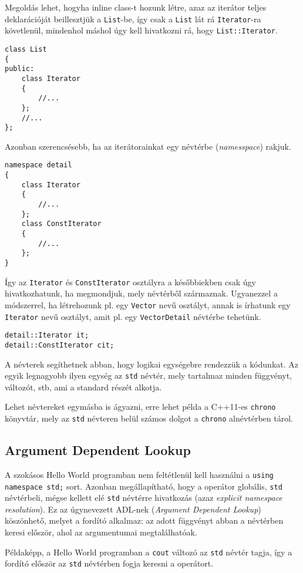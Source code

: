 \documentclass[a4paper,11.5pt,table]{article}
\begin{document}
	Megoldás lehet, hogyha inline class-t hozunk létre, azaz az iterátor teljes deklarációját beillesztjük a \texttt{List}-be, így csak a \texttt{List} lát rá \texttt{Iterator}-ra követlenül, mindenhol máshol úgy kell hivatkozni rá, hogy \texttt{List::Iterator}.
	\begin{lstlisting}
class List
{
public:
	class Iterator
	{
		//...
	};
	//...
};
	\end{lstlisting}
	
	Azonban szerencsésebb, ha az iterátorainkat egy névtérbe (\textit{namesspace}) rakjuk.
\begin{lstlisting}
namespace detail
{
	class Iterator
	{
		//...
	};
	class ConstIterator
	{
		//...
	};
}
\end{lstlisting}
	Így az \texttt{Iterator} és \texttt{ConstIterator} osztályra a későbbiekben csak úgy hivatkozhatunk, ha megmondjuk, mely névtérből származnak. Ugyanezzel a módszerrel, ha létrehozunk pl. egy \texttt{Vector} nevű osztályt, annak is írhatunk egy \texttt{Iterator} nevű osztályt, amit pl. egy \texttt{VectorDetail} névtérbe tehetünk.
	\begin{lstlisting}
detail::Iterator it;
detail::ConstIterator cit;
	\end{lstlisting}

	A névterek segíthetnek abban, hogy logikai egységebre rendezzük a kódunkat. Az egyik legnagyobb ilyen egység az \texttt{std} névtér, mely tartalmaz minden függvényt, változót, stb, ami a standard részét alkotja. 
	
	Lehet névtereket egymásba is ágyazni, erre lehet példa a C++11-es \texttt{chrono} könyvtár, mely az \texttt{std} névteren belül számos dolgot a \texttt{chrono} alnévtérben tárol.
	\subsection{Argument Dependent Lookup}
	A szokásos Hello World programban nem feltétlenül kell használni a \texttt{using namespace std;} sort. Azonban megállapítható, hogy a \texttt{\<} operátor globális, \texttt{std} névtérbeli, mégse kellett elé \texttt{std} névtérre hivatkozás (azaz \textit{explicit namespace resolution}). Ez az úgynevezett ADL-nek (\textit{Argument Dependent Lookup}) köszönhető, melyet a fordító alkalmaz: az adott függvényt abban a névtérben keresi először, ahol az argumentumai megtalálhatóak.
	
	\smallskip
	Példaképp, a Hello World programban a \texttt{cout} változó az \texttt{std} névtér tagja, így a fordító először az \texttt{std} névtérben fogja keresni a \texttt{\<} operátort.
\end{document}
